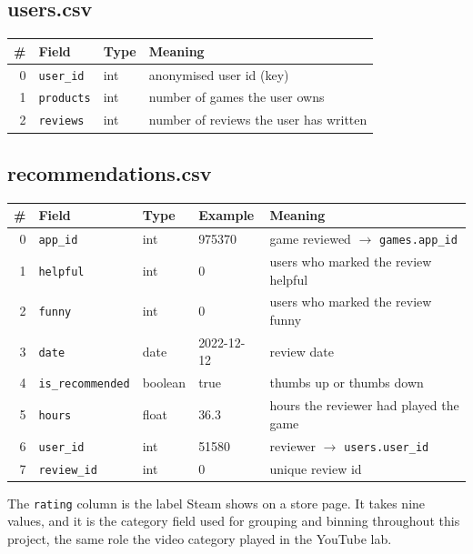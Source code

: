 \documentclass[11pt,a4paper]{article}
\newcommand{\code}[1]{\texttt{#1}}
\begin{document}
\subsection*{users.csv}
\begin{table}[H]\centering\small
\begin{tabular}{rlll}
\toprule
\# & Field & Type & Meaning \\
\midrule
0 & \code{user\_id}  & int & anonymised user id (key) \\
1 & \code{products}  & int & number of games the user owns \\
2 & \code{reviews}   & int & number of reviews the user has written \\
\bottomrule
\end{tabular}
\end{table}

\subsection*{recommendations.csv}
\begin{table}[H]\centering\small
\begin{tabular}{rllll}
\toprule
\# & Field & Type & Example & Meaning \\
\midrule
0 & \code{app\_id}          & int     & 975370     & game reviewed $\rightarrow$ \code{games.app\_id} \\
1 & \code{helpful}          & int     & 0          & users who marked the review helpful \\
2 & \code{funny}            & int     & 0          & users who marked the review funny \\
3 & \code{date}             & date    & 2022-12-12 & review date \\
4 & \code{is\_recommended}  & boolean & true       & thumbs up or thumbs down \\
5 & \code{hours}            & float   & 36.3       & hours the reviewer had played the game \\
6 & \code{user\_id}         & int     & 51580      & reviewer $\rightarrow$ \code{users.user\_id} \\
7 & \code{review\_id}       & int     & 0          & unique review id \\
\bottomrule
\end{tabular}
\end{table}

The \code{rating} column is the label Steam shows on a store page. It takes nine values, and it is
the category field used for grouping and binning throughout this project, the same role the video
category played in the YouTube lab.
\end{document}
